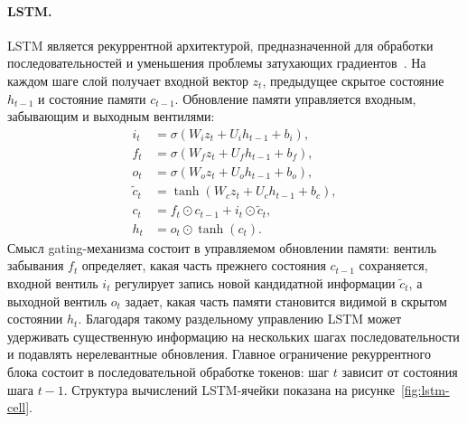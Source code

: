 \paragraph{LSTM.}
LSTM является рекуррентной архитектурой, предназначенной для обработки последовательностей и уменьшения проблемы затухающих градиентов~\cite{lstm}.
На каждом шаге слой получает входной вектор $z_t$, предыдущее скрытое состояние $h_{t-1}$ и состояние памяти $c_{t-1}$.
Обновление памяти управляется входным, забывающим и выходным вентилями:
\[
	\begin{aligned}
		i_t         & = \sigma(W_i z_t + U_i h_{t-1} + b_i),       \\
		f_t         & = \sigma(W_f z_t + U_f h_{t-1} + b_f),       \\
		o_t         & = \sigma(W_o z_t + U_o h_{t-1} + b_o),       \\
		\tilde{c}_t & = \tanh(W_c z_t + U_c h_{t-1} + b_c),        \\
		c_t         & = f_t \odot c_{t-1} + i_t \odot \tilde{c}_t, \\
		h_t         & = o_t \odot \tanh(c_t).
	\end{aligned}
\]
Смысл gating-механизма состоит в управляемом обновлении памяти: вентиль забывания $f_t$ определяет, какая часть прежнего состояния $c_{t-1}$ сохраняется, входной вентиль $i_t$ регулирует запись новой кандидатной информации $\tilde{c}_t$, а выходной вентиль $o_t$ задает, какая часть памяти становится видимой в скрытом состоянии $h_t$. Благодаря такому раздельному управлению LSTM может удерживать существенную информацию на нескольких шагах последовательности и подавлять нерелевантные обновления.
Главное ограничение рекуррентного блока состоит в последовательной обработке токенов: шаг $t$ зависит от состояния шага $t-1$.
Структура вычислений LSTM-ячейки показана на рисунке~\ref{fig:lstm-cell}.

